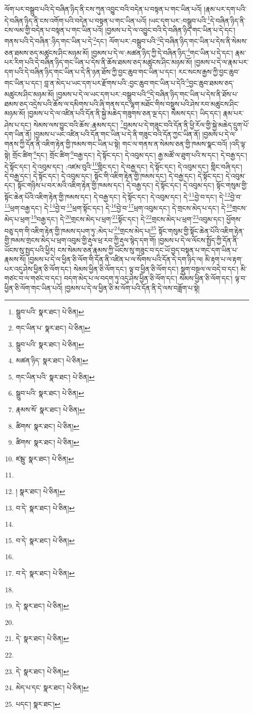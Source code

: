 ལོག་པར་བསྒྲུབ་པའི་དེ་བཞིན་ཉིད་ནི་ངས་ཀུན་འབྱུང་བའི་བདེན་པ་བསྟན་པ་གང་ཡིན་པའོ། །རྣམ་པར་དག་པའི་དེ་བཞིན་ཉིད་ནི་ངས་འགོག་པའི་བདེན་པ་བསྟན་པ་གང་ཡིན་པའོ། །ཡང་དག་པར་:བསྒྲུབ་པའི་\footnote{སྒྲུབ་པའི་  སྣར་ཐང་།  པེ་ཅིན། }དེ་བཞིན་ཉིད་ནི་ངས་ལམ་གྱི་བདེན་པ་བསྟན་པ་གང་ཡིན་པའོ། །བྱམས་པ་དེ་ལ་འབྱུང་བའི་དེ་བཞིན་ཉིད་གང་ཡིན་པ་དེ་དང་། གནས་པའི་དེ་བཞིན་:ཉིད་གང་ཡིན་པ་དེ་\footnote{གང་ཡིན་པ་  སྣར་ཐང་།  པེ་ཅིན། }དང་། ལོག་པར་:བསྒྲུབ་པའི་\footnote{སྒྲུབ་པའི་  སྣར་ཐང་།  པེ་ཅིན། }དེ་བཞིན་ཉིད་གང་ཡིན་པ་དེས་ནི་སེམས་ཅན་ཐམས་ཅད་མཚུངས་ཤིང་མཉམ་མོ། །བྱམས་པ་དེ་ལ་:མཚན་ཉིད་ཀྱི་དེ་བཞིན་ཉིད་\footnote{མཚན་ཉིད་  སྣར་ཐང་།  པེ་ཅིན། }གང་ཡིན་པ་དེ་དང་། རྣམ་པར་རིག་པའི་དེ་བཞིན་ཉིད་གང་ཡིན་པ་དེས་ནི་ཆོས་ཐམས་ཅད་མཚུངས་ཤིང་མཉམ་མོ། །བྱམས་པ་དེ་ལ་རྣམ་པར་དག་པའི་དེ་བཞིན་ཉིད་གང་ཡིན་པ་དེ་ནི་ཉན་ཐོས་ཀྱི་བྱང་ཆུབ་གང་ཡིན་པ་དང་། རང་སངས་རྒྱས་ཀྱི་བྱང་ཆུབ་གང་ཡིན་པ་དང་། བླ་ན་མེད་པ་ཡང་དག་པར་རྫོགས་པའི་:བྱང་ཆུབ་གང་ཡིན་པ་དེའི་\footnote{གང་ཡིན་པའི་  སྣར་ཐང་།  པེ་ཅིན། }བྱང་ཆུབ་ཐམས་ཅད་མཚུངས་ཤིང་མཉམ་མོ། །བྱམས་པ་དེ་ལ་ཡང་དག་པར་:བསྒྲུབ་པའི་\footnote{སྒྲུབ་པའི་  སྣར་ཐང་།  པེ་ཅིན། }དེ་བཞིན་ཉིད་གང་ཡིན་པ་དེས་ནི་ཐོས་པ་ཐམས་ཅད་འདྲེས་པའི་ཆོས་ལ་དམིགས་པའི་ཞི་གནས་དང་ལྷག་མཐོང་གིས་བསྡུས་པའི་ཤེས་རབ་མཚུངས་ཤིང་མཉམ་མོ། །བྱམས་པ་དེ་ལ་འཛིན་པའི་དོན་ནི་སྐྱེ་མཆེད་གཟུགས་ཅན་ལྔ་དང་། སེམས་དང་། ཡིད་དང་། རྣམ་པར་ཤེས་པ་དང་། སེམས་ལས་བྱུང་བའི་ཆོས་:རྣམས་དང་། \footnote{རྣམས་སོ་  སྣར་ཐང་།  པེ་ཅིན། }བྱམས་པ་དེ་གཟུང་བའི་དོན་ནི་ཕྱི་རོལ་གྱི་སྐྱེ་མཆེད་དྲུག་པོ་དག་ཡིན་ནོ། །བྱམས་པ་ཡང་འཛིན་པའི་དོན་གང་ཡིན་པ་དེ་ནི་གཟུང་བའི་དོན་ཀྱང་ཡིན་ནོ། །བྱམས་པ་དེ་ལ་གནས་ཀྱི་དོན་ནི་འཇིག་རྟེན་གྱི་ཁམས་གང་ཡིན་པ་སྟེ། གང་ལ་གནས་ན་སེམས་ཅན་གྱི་ཁམས་སྣང་བའོ། །འདི་ལྟ་སྟེ། གྲོང་ཚིག་\footnote{ཚིགས་  སྣར་ཐང་།  པེ་ཅིན། }དང་། གྲོང་ཚིག་\footnote{ཚིགས་  སྣར་ཐང་།  པེ་ཅིན། }བརྒྱ་དང་། དེ་སྟོང་དང་། དེ་འབུམ་དང་། རྒྱ་མཚོ་ལ་ཐུག་པའི་ས་དང་། དེ་བརྒྱ་དང་། དེ་སྟོང་དང་། དེ་འབུམ་དང་། :འཛམ་བུའི་\footnote{ཛམྦུ་  སྣར་ཐང་།  པེ་ཅིན། }གླིང་དང་། དེ་བརྒྱ་དང་། དེ་སྟོང་དང་། དེ་འབུམ་དང་། གླིང་བཞི་དང་། དེ་བརྒྱ་དང་། དེ་སྟོང་དང་། དེ་འབུམ་དང་། སྟོང་གི་འཇིག་རྟེན་གྱི་ཁམས་དང་། དེ་བརྒྱ་དང་། དེ་སྟོང་དང་། དེ་འབུམ་དང་། སྟོང་གཉིས་པ་བར་མའི་འཇིག་རྟེན་གྱི་ཁམས་དང་། དེ་བརྒྱ་དང་། དེ་སྟོང་དང་། དེ་འབུམ་དང་། སྟོང་གསུམ་གྱི་སྟོང་ཆེན་པོའི་འཇིག་རྟེན་གྱི་ཁམས་དང་། དེ་བརྒྱ་དང་། དེ་སྟོང་དང་། དེ་འབུམ་དང་། དེ་\footnote{}བྱེ་བ་དང་། དེ་\footnote{།  སྣར་ཐང་།  པེ་ཅིན། }བྱེ་བ་\footnote{བ་དེ་  སྣར་ཐང་།  པེ་ཅིན། }ཕྲག་བརྒྱ་དང་། དེ་\footnote{}བྱེ་བ་\footnote{བ་དེ་  སྣར་ཐང་།  པེ་ཅིན། }ཕྲག་སྟོང་དང་། དེ་\footnote{}བྱེ་བ་\footnote{བ་དེ་  སྣར་ཐང་།  པེ་ཅིན། }ཕྲག་འབུམ་དང་། དེ་གྲངས་མེད་པ་དང་། དེ་\footnote{}གྲངས་མེད་པ་ཕྲག་\footnote{དེ་  སྣར་ཐང་།  པེ་ཅིན། }བརྒྱ་དང་། དེ་\footnote{}གྲངས་མེད་པ་ཕྲག་\footnote{དེ་  སྣར་ཐང་།  པེ་ཅིན། }སྟོང་དང་། དེ་\footnote{}གྲངས་མེད་པ་ཕྲག་\footnote{དེ་  སྣར་ཐང་།  པེ་ཅིན། }འབུམ་དང་། ཕྱོགས་བཅུ་དག་གི་འཇིག་རྟེན་གྱི་ཁམས་དཔག་ཏུ་:མེད་པ་\footnote{མེད་པ་དང་  སྣར་ཐང་།  པེ་ཅིན། }གྲངས་མེད་པ།\footnote{པདང་།  སྣར་ཐང་། } སྟོང་གསུམ་གྱི་སྟོང་ཆེན་པོའི་འཇིག་རྟེན་གྱི་ཁམས་གྲངས་མེད་པ་ཕྲག་འབུམ་གྱི་རྡུལ་ཕྲ་རབ་ཀྱི་རྡུལ་སྙེད་དག་གོ། །བྱམས་པ་དེ་ལ་ལོངས་སྤྱོད་ཀྱི་དོན་ནི་ཡོངས་སུ་སྤྱད་པའི་ཕྱིར། ངས་སེམས་ཅན་རྣམས་ཀྱི་ཡོངས་སུ་གཟུང་བ་དང་ཡོ་བྱད་བསྟན་པ་གང་དག་ཡིན་པ་རྣམས་སོ། །བྱམས་པ་དེ་ལ་ཕྱིན་ཅི་ལོག་གི་དོན་ནི་འཛིན་པ་ལ་སོགས་པའི་དོན་དེ་དག་ཉིད་ལ། མི་རྟག་པ་ལ་རྟག་པར་འདུ་ཤེས་ཕྱིན་ཅི་ལོག་དང་། སེམས་ཕྱིན་ཅི་ལོག་དང་། ལྟ་བ་ཕྱིན་ཅི་ལོག་དང་། སྡུག་བསྔལ་ལ་བདེ་བ་དང་། མི་གཙང་བ་ལ་གཙང་བ་དང་། བདག་མེད་པ་ལ་བདག་ཏུ་འདུ་ཤེས་ཕྱིན་ཅི་ལོག་དང་། སེམས་ཕྱིན་ཅི་ལོག་དང་། ལྟ་བ་ཕྱིན་ཅི་ལོག་གང་ཡིན་པའོ། །བྱམས་པ་དེ་ལ་ཕྱིན་ཅི་མ་ལོག་པའི་དོན་ནི་དེ་ལས་བཟློག་པ་སྟེ། 